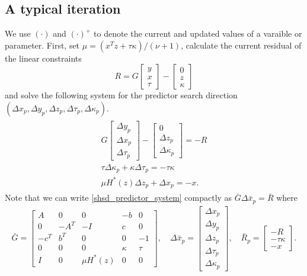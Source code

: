 \documentclass[10pt]{article}
\theoremstyle{definition}
\theoremstyle{plain}
\begin{document}
\subsection{A typical iteration}
We use $(\cdot)$ and $(\cdot)^+$ to denote the current and updated values of a varaible or parameter. First, set $\mu = \left(x^T z + \tau \kappa\right)/\left(\nu+1\right)$, calculate the current residual of the linear constraints
\[R = G \begin{bmatrix}
y \\ x \\ \tau
\end{bmatrix} - 
\begin{bmatrix}
0 \\ z \\ \kappa 
\end{bmatrix}\]
and solve the following system for the predictor search direction $(\Delta x_p, \Delta y_p, \Delta z_p, \Delta \tau_p, \Delta \kappa_p)$.
\begin{align}
\begin{split}
G\begin{bmatrix}
\Delta y_p \\ \Delta x_p \\ \Delta \tau_p
\end{bmatrix} - 
\begin{bmatrix}
0 \\ \Delta z_p \\ \Delta \kappa_p
\end{bmatrix} = -R \\[1ex]
\tau\Delta \kappa_p+\kappa\Delta \tau_p = -\tau\kappa \\[1ex]
\mu H^*(z)\Delta z_p + \Delta x_p = -x. 
\end{split}	 \label{shsd_predictor_system}
\end{align}
Note that we can write \eqref{shsd_predictor_system} compactly as $\bar G \Delta \bar{x}_p = \bar{R}$ where 
\begin{align} \label{G_bar_etc_def}
\bar{G} = \begin{bmatrix}
A & 0 &0 & -b & 0 \\
0 & -A^T & -I & c & 0 \\
-c^T & b^T & 0 & 0 & -1 \\
0 & 0 & 0 & \kappa & \tau \\
I & 0 & \mu H^*(z) & 0 & 0 
\end{bmatrix},\quad \Delta \bar{x}_p = \begin{bmatrix}
\Delta x_p \\ \Delta y_p \\ \Delta z_p \\ \Delta \tau_p \\ \Delta \kappa_p
\end{bmatrix},\quad \bar{R}_p = \begin{bmatrix}
-R \\ -\tau\kappa \\ -x
\end{bmatrix}.\end{align}
\end{document}
